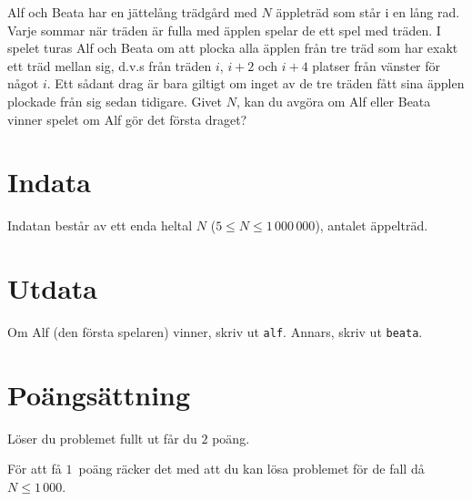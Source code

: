 Alf och Beata har en jättelång trädgård med $N$ äppleträd som står i en lång rad.
Varje sommar när träden är fulla med äpplen spelar de ett spel med träden.
I spelet turas Alf och Beata om att plocka alla äpplen från tre träd som har exakt ett träd mellan sig, d.v.s från träden $i$, $i + 2$ och $i + 4$ platser från vänster för något $i$.
Ett sådant drag är bara giltigt om inget av de tre träden fått sina äpplen plockade från sig sedan tidigare.
Givet $N$, kan du avgöra om Alf eller Beata vinner spelet om Alf gör det första draget?

\section*{Indata}
Indatan består av ett enda heltal $N$ ($5 \le N \le 1\,000\,000$), antalet äppelträd.

\section*{Utdata}
Om Alf (den första spelaren) vinner, skriv ut \texttt{alf}.
Annars, skriv ut \texttt{beata}.

\section*{Poängsättning}
Löser du problemet fullt ut får du $2$ poäng.

För att få $1$ poäng räcker det med att du kan lösa problemet för de fall då $N \le 1\,000$.
